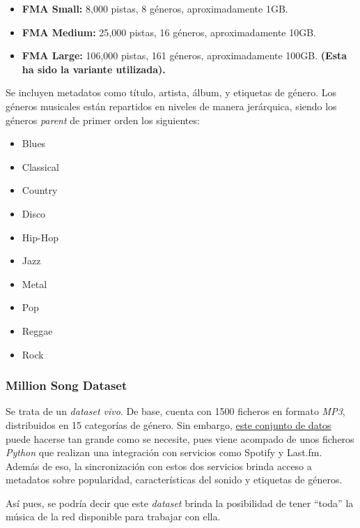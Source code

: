 \begin{itemize}
    \item \textbf{FMA Small:} 8,000 pistas, 8 géneros, aproximadamente 1GB.
    \item \textbf{FMA Medium:} 25,000 pistas, 16 géneros, aproximadamente 10GB.
    \item \textbf{FMA Large:} 106,000 pistas, 161 géneros, aproximadamente 100GB. \textbf{(Esta ha sido la variante utilizada).}
\end{itemize}

Se incluyen metadatos como título, artista, álbum, y etiquetas de género. Los géneros musicales están repartidos en niveles de manera jerárquica, siendo los géneros \emph{parent} de primer orden los siguientes:

\begin{multicols}{4}
\begin{itemize}
    \item Blues
    \item Classical
    \item Country
    \item Disco
    \item Hip-Hop
    \item Jazz
    \item Metal
    \item Pop
    \item Reggae
    \item Rock
\end{itemize}
\end{multicols}

\subsubsection{Million Song Dataset}

Se trata de un \emph{dataset vivo}. De base, cuenta con 1500 ficheros en formato \emph{MP3}, distribuidos en 15 categorías de género. Sin embargo, \href{https://www.kaggle.com/datasets/undefinenull/million-song-dataset-spotify-lastfm}{este conjunto de datos} puede hacerse tan grande como se necesite, pues viene acompado de unos ficheros \emph{Python} que realizan una integración con servicios como Spotify y Last.fm. Además de eso, la sincronización con estos dos servicios brinda acceso a metadatos sobre popularidad, características del sonido y etiquetas de géneros.

Así pues, se podría decir que este \emph{dataset} brinda la posibilidad de tener ``toda'' la música de la red disponible para trabajar con ella.

